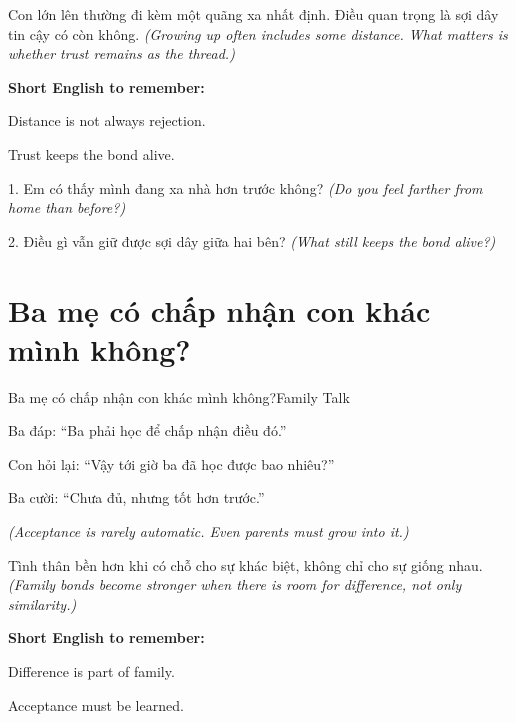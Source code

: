 \begin{baihoc}
Con lớn lên thường đi kèm một quãng xa nhất định. Điều quan trọng là sợi dây tin cậy có còn không.
\textit{(Growing up often includes some distance. What matters is whether trust remains as the thread.)}
\end{baihoc}

\begin{ghinhoanh}
\textbf{Short English to remember:}

Distance is not always rejection.

Trust keeps the bond alive.
\end{ghinhoanh}

\begin{tuhocnhanh}
1. Em có thấy mình đang xa nhà hơn trước không? \textit{(Do you feel farther from home than before?)}

2. Điều gì vẫn giữ được sợi dây giữa hai bên? \textit{(What still keeps the bond alive?)}
\end{tuhocnhanh}
\ngancach

\section{Ba mẹ có chấp nhận con khác mình không?}
\begin{truyen}{Ba mẹ có chấp nhận con khác mình không?}{Family Talk}

Ba đáp: ``Ba phải học để chấp nhận điều đó.''

Con hỏi lại: ``Vậy tới giờ ba đã học được bao nhiêu?''

Ba cười: ``Chưa đủ, nhưng tốt hơn trước.''

\textit{(Acceptance is rarely automatic. Even parents must grow into it.)}
\end{truyen}

\begin{baihoc}
Tình thân bền hơn khi có chỗ cho sự khác biệt, không chỉ cho sự giống nhau.
\textit{(Family bonds become stronger when there is room for difference, not only similarity.)}
\end{baihoc}

\begin{ghinhoanh}
\textbf{Short English to remember:}

Difference is part of family.

Acceptance must be learned.
\end{ghinhoanh}

